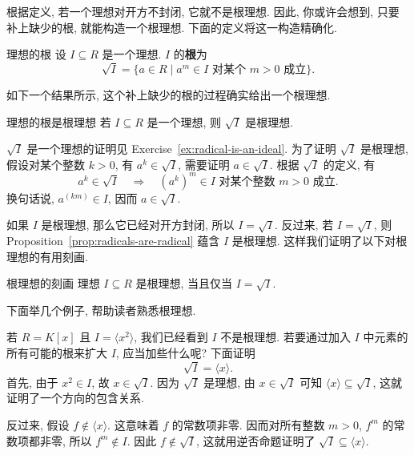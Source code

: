 根据定义, 若一个理想对开方不封闭, 它就不是根理想. 因此, 你或许会想到, 只要补上缺少的根, 就能构造一个根理想. 下面的定义将这一构造精确化.

\begin{Definition}{理想的根}\leavevmode\label{def:radical-of-an-ideal}
  设 $I\subseteq R$ 是一个理想. $I$ 的\textbf{根}为
  \[
    \sqrt{I}=\{a\in R\mid a^{m}\in I\text{ 对某个 }m>0\text{ 成立}\}.
  \]
\end{Definition}

如下一个结果所示, 这个\textquotedbl{}补上缺少的根\textquotedbl{}的过程确实给出一个根理想.

\begin{Proposition}{理想的根是根理想}\leavevmode\label{prop:radicals-are-radical}
  若 $I\subseteq R$ 是一个理想, 则 $\sqrt{I}$ 是根理想.
\end{Proposition}

\begin{Proof}
  $\sqrt{I}$ 是一个理想的证明见 Exercise~\ref{ex:radical-is-an-ideal}. 为了证明 $\sqrt{I}$ 是根理想, 假设对某个整数 $k>0$, 有 $a^{k}\in\sqrt{I}$, 需要证明 $a\in\sqrt{I}$. 根据 $\sqrt{I}$ 的定义, 有
  \[
    a^{k}\in\sqrt{I}\quad\Longrightarrow\quad(a^{k})^{m}\in I
      \text{ 对某个整数 }m>0\text{ 成立}.
  \]
  换句话说, $a^{(km)}\in I$, 因而 $a\in\sqrt{I}$.
\end{Proof}

如果 $I$ 是根理想, 那么它已经对开方封闭, 所以 $I=\sqrt{I}$. 反过来, 若 $I=\sqrt{I}$, 则 Proposition~\ref{prop:radicals-are-radical} 蕴含 $I$ 是根理想. 这样我们证明了以下对根理想的有用刻画.

\begin{Corollary}{根理想的刻画}\leavevmode\label{cor:characterize-radical-ideals}
  理想 $I\subseteq R$ 是根理想, 当且仅当 $I=\sqrt{I}$.
\end{Corollary}

下面举几个例子, 帮助读者熟悉根理想.

\begin{Example}{}\leavevmode\label{ex:radical-of-square-variable}
  若 $R=K[x]$ 且 $I=\langle x^{2}\rangle$, 我们已经看到 $I$ 不是根理想. 若要通过加入 $I$ 中元素的所有可能的根来扩大 $I$, 应当加些什么呢? 下面证明
  \[
    \sqrt{I}=\langle x\rangle.
  \]
  首先, 由于 $x^{2}\in I$, 故 $x\in\sqrt{I}$. 因为 $\sqrt{I}$ 是理想, 由 $x\in\sqrt{I}$ 可知 $\langle x\rangle\subseteq\sqrt{I}$, 这就证明了一个方向的包含关系.

  反过来, 假设 $f\notin\langle x\rangle$. 这意味着 $f$ 的常数项非零. 因而对所有整数 $m>0$, $f^{m}$ 的常数项都非零, 所以 $f^{m}\notin I$. 因此 $f\notin\sqrt{I}$, 这就用逆否命题证明了 $\sqrt{I}\subseteq\langle x\rangle$.
\end{Example}

